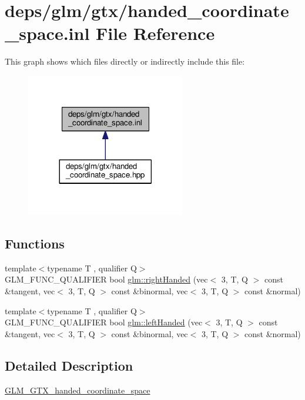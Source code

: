 \hypertarget{handed__coordinate__space_8inl}{}\section{deps/glm/gtx/handed\+\_\+coordinate\+\_\+space.inl File Reference}
\label{handed__coordinate__space_8inl}
This graph shows which files directly or indirectly include this file\+:
\nopagebreak
\begin{figure}[H]
\begin{center}
\leavevmode
\includegraphics[width=197pt]{d8/d84/handed__coordinate__space_8inl__dep__incl}
\end{center}
\end{figure}
\subsection*{Functions}
\begin{DoxyCompactItemize}
\item 
{\footnotesize template$<$typename T , qualifier Q$>$ }\\G\+L\+M\+\_\+\+F\+U\+N\+C\+\_\+\+Q\+U\+A\+L\+I\+F\+I\+ER bool \hyperlink{group__gtx__handed__coordinate__space_ga99386a5ab5491871b947076e21699cc8}{glm\+::right\+Handed} (vec$<$ 3, T, Q $>$ const \&tangent, vec$<$ 3, T, Q $>$ const \&binormal, vec$<$ 3, T, Q $>$ const \&normal)
\item 
{\footnotesize template$<$typename T , qualifier Q$>$ }\\G\+L\+M\+\_\+\+F\+U\+N\+C\+\_\+\+Q\+U\+A\+L\+I\+F\+I\+ER bool \hyperlink{group__gtx__handed__coordinate__space_ga6f1bad193b9a3b048543d1935cf04dd3}{glm\+::left\+Handed} (vec$<$ 3, T, Q $>$ const \&tangent, vec$<$ 3, T, Q $>$ const \&binormal, vec$<$ 3, T, Q $>$ const \&normal)
\end{DoxyCompactItemize}


\subsection{Detailed Description}
\hyperlink{group__gtx__handed__coordinate__space}{G\+L\+M\+\_\+\+G\+T\+X\+\_\+handed\+\_\+coordinate\+\_\+space} 